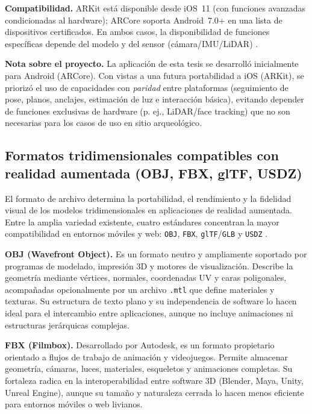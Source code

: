 \textbf{Compatibilidad.} ARKit está disponible desde iOS~11 (con funciones avanzadas condicionadas al hardware); ARCore soporta Android~7.0+ en una lista de dispositivos certificados. En ambos casos, la disponibilidad de funciones específicas depende del modelo y del sensor (cámara/IMU/LiDAR) \cite{Onirix2021ARKitARCore,GoogleARCoreOverview,AppleARKitOverview}.

\textbf{Nota sobre el proyecto.} La aplicación de esta tesis se desarrolló inicialmente para Android (ARCore). Con vistas a una futura portabilidad a iOS (ARKit), se priorizó el uso de capacidades con \emph{paridad} entre plataformas (seguimiento de pose, planos, anclajes, estimación de luz e interacción básica), evitando depender de funciones exclusivas de hardware (p. ej., LiDAR/face tracking) que no son necesarias para los casos de uso en sitio arqueológico.

\subsection*{Formatos tridimensionales compatibles con realidad aumentada (OBJ, FBX, glTF, USDZ)}

El formato de archivo determina la portabilidad, el rendimiento y la fidelidad visual de los modelos tridimensionales en aplicaciones de realidad aumentada. Entre la amplia variedad existente, cuatro estándares concentran la mayor compatibilidad en entornos móviles y web: \texttt{OBJ}, \texttt{FBX}, \texttt{glTF}/\texttt{GLB} y \texttt{USDZ} \cite{Schechter2025,PixelLab2025}.

\textbf{OBJ (Wavefront Object).} Es un formato neutro y ampliamente soportado por programas de modelado, impresión 3D y motores de visualización. Describe la geometría mediante vértices, normales, coordenadas UV y caras poligonales, acompañadas opcionalmente por un archivo \texttt{.mtl} que define materiales y texturas. Su estructura de texto plano y su independencia de software lo hacen ideal para el intercambio entre aplicaciones, aunque no incluye animaciones ni estructuras jerárquicas complejas.

\textbf{FBX (Filmbox).} Desarrollado por Autodesk, es un formato propietario orientado a flujos de trabajo de animación y videojuegos. Permite almacenar geometría, cámaras, luces, materiales, esqueletos y animaciones completas. Su fortaleza radica en la interoperabilidad entre software 3D (Blender, Maya, Unity, Unreal Engine), aunque su tamaño y naturaleza cerrada lo hacen menos eficiente para entornos móviles o web livianos.

